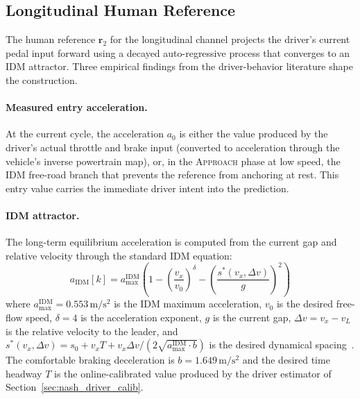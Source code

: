 \documentclass[12pt,a4paper,oneside]{report}
\begin{document}
\subsection{Longitudinal Human Reference}
\label{sec:long_human_ref}

The human reference $\mathbf{r}_2$ for the longitudinal channel projects the driver's current pedal input forward using a decayed auto-regressive process that converges to an IDM attractor. Three empirical findings from the driver-behavior literature shape the construction.

\paragraph{Measured entry acceleration.} At the current cycle, the acceleration $a_0$ is either the value produced by the driver's actual throttle and brake input (converted to acceleration through the vehicle's inverse powertrain map), or, in the \textsc{Approach} phase at low speed, the IDM free-road branch that prevents the reference from anchoring at rest. This entry value carries the immediate driver intent into the prediction.

\paragraph{IDM attractor.} The long-term equilibrium acceleration is computed from the current gap and relative velocity through the standard IDM equation:
\begin{equation}
a_{\text{IDM}}[k] = a_{\max}^{\text{IDM}} \left( 1 - \left( \frac{v_x}{v_0} \right)^\delta - \left( \frac{s^{*}(v_x, \Delta v)}{g} \right)^2 \right)
\label{eq:idm_attractor}
\end{equation}
where $a_{\max}^{\text{IDM}} = 0.553\,\mathrm{m/s^2}$ is the IDM maximum acceleration, $v_0$ is the desired free-flow speed, $\delta = 4$ is the acceleration exponent, $g$ is the current gap, $\Delta v = v_x - v_L$ is the relative velocity to the leader, and $s^{*}(v_x, \Delta v) = s_0 + v_x T + v_x \Delta v / (2 \sqrt{a_{\max}^{\text{IDM}} \cdot b})$ is the desired dynamical spacing~\cite{treiberCongestedTrafficStates2000}. The comfortable braking deceleration is $b = 1.649\,\mathrm{m/s^2}$ and the desired time headway $T$ is the online-calibrated value produced by the driver estimator of Section~\ref{sec:nash_driver_calib}.
\end{document}
